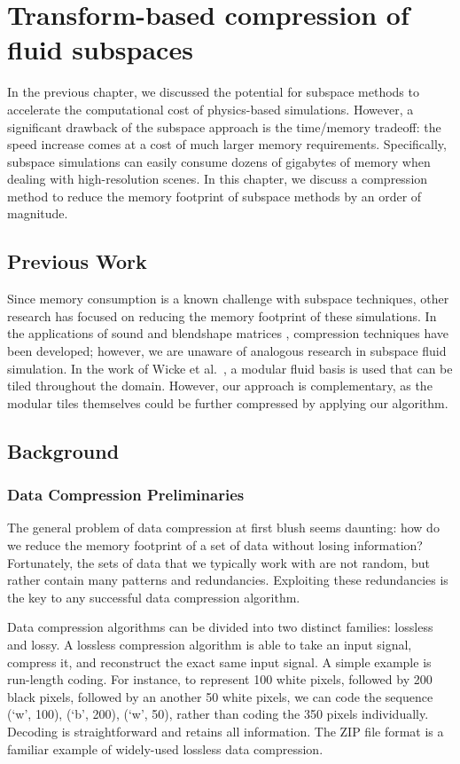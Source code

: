 \chapter[Transform-based compression of fluid subspaces]{Transform-based compression of fluid subspaces}

In the previous chapter, we discussed the potential for subspace methods to accelerate the computational cost of physics-based simulations. However, a significant drawback of the subspace approach is the time/memory tradeoff: the speed increase comes at a cost of much larger memory requirements. Specifically, subspace simulations can easily consume dozens of gigabytes of memory when dealing with high-resolution scenes. In this chapter, we discuss a compression method to reduce the memory footprint of subspace methods by an order of magnitude. 

\section{Previous Work}
Since memory consumption is a known challenge with subspace techniques, other research has focused on reducing the memory footprint of these simulations. In the applications of sound \cite{Langlois:2014:ECM} and blendshape matrices \cite{Seo:2011:CDM}, compression techniques have been developed; however, we are unaware of analogous research in subspace fluid simulation. In the work of Wicke et al.~\cite{Wicke:2009}, a modular fluid basis is used that can be tiled throughout the domain. However, our approach is complementary, as the modular tiles themselves could be further compressed by applying our algorithm.

\section{Background}
\subsection{Data Compression Preliminaries}
The general problem of data compression at first blush seems daunting: how do we reduce the memory footprint of a set of data without losing information? Fortunately, the sets of data that we typically work with are not random, but rather contain many patterns and redundancies. Exploiting these redundancies is the key to any successful data compression algorithm.

Data compression algorithms can be divided into two distinct families: lossless and lossy. A lossless compression algorithm is able to take an input signal, compress it, and reconstruct the exact same input signal. A simple example is run-length coding. For instance, to represent 100 white pixels, followed by 200 black pixels, followed by an another 50 white pixels, we can code the sequence (`w', 100), (`b', 200), (`w', 50), rather than coding the 350 pixels individually. Decoding is straightforward and retains all information. The ZIP file format is a familiar example of widely-used lossless data compression.

